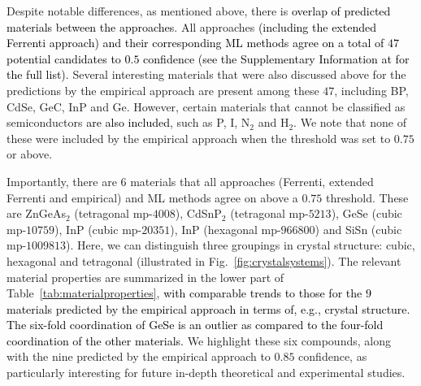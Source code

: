 \documentclass[superscriptaddress,unsortedaddress,
 amsmath,amssymb,
 aps,
]{revtex4-2}
\newcommand{\mrk}[1]{\textcolor{black}{#1}}
\begin{document}
Despite notable differences, as mentioned above, there is \mrk{overlap of predicted materials between the approaches}. 
All approaches \mrk{(including the extended Ferrenti approach) and their corresponding ML methods agree on a total of $47$ potential candidates to $0.5$ confidence 
(see the Supplementary Information at \cite{supplementary} for the full list).} 
Several interesting materials that were also discussed above for the predictions by the empirical approach are present among these $47$, including BP, CdSe, GeC, InP and Ge. However, certain materials that cannot be classified as semiconductors \mrk{are also included}, such as P, I, N$_2$ and H$_2$. We note that none of these were included by the empirical approach when the threshold was set to $0.75$ or above. 

Importantly, there are $6$ materials that all approaches (Ferrenti, extended Ferrenti and empirical) and ML methods agree on above a $0.75$ threshold. These are ZnGeAs$_2$ (tetragonal mp-$4008$), CdSnP$_2$ (tetragonal mp-$5213$), GeSe (cubic mp-$10759$), InP (cubic mp-$20351$), InP (hexagonal mp-$966800$) and SiSn (cubic mp-$1009813$). Here, we can distinguish three groupings in crystal structure: cubic, hexagonal and tetragonal (illustrated in Fig.~\ref{fig:crystalsystems}). The relevant material properties are summarized in the lower part of Table~\ref{tab:materialproperties}, 
\mrk{with comparable trends to those for the $9$ materials predicted by the empirical approach in terms of, e.g., crystal structure. The six-fold coordination of GeSe is an outlier as compared to the four-fold coordination of the other materials. }
We highlight these six compounds, along with the nine predicted by the empirical approach to $0.85$ confidence, as particularly interesting for future in-depth theoretical and experimental studies. 
\end{document}

